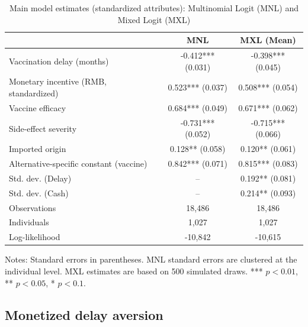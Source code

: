\documentclass[doublespacing]{utdthesis}
\begin{document}
\begin{table}[htbp]
\centering
\caption{Main model estimates (standardized attributes): Multinomial Logit (MNL) and Mixed Logit (MXL)}
\label{tab:main_models_std}
\begin{threeparttable}
\begin{tabular}{lcc}
\toprule
 & MNL & MXL (Mean) \\
\midrule
Vaccination delay (months) & -0.412*** (0.031) & -0.398*** (0.045) \\
Monetary incentive (RMB, standardized) & 0.523*** (0.037) & 0.508*** (0.054) \\
Vaccine efficacy & 0.684*** (0.049) & 0.671*** (0.062) \\
Side-effect severity & -0.731*** (0.052) & -0.715*** (0.066) \\
Imported origin & 0.128** (0.058) & 0.120** (0.061) \\
Alternative-specific constant (vaccine) & 0.842*** (0.071) & 0.815*** (0.083) \\
\midrule
Std. dev. (Delay) & -- & 0.192** (0.081) \\
Std. dev. (Cash) & -- & 0.214** (0.093) \\
\midrule
Observations & 18,486 & 18,486 \\
Individuals & 1,027 & 1,027 \\
Log-likelihood & -10,842 & -10,615 \\
\bottomrule
\end{tabular}
\begin{tablenotes}
\footnotesize
\item Notes: Standard errors in parentheses. MNL standard errors are clustered at the individual level. MXL estimates are based on 500 simulated draws. *** $p<0.01$, ** $p<0.05$, * $p<0.1$.
\end{tablenotes}
\end{threeparttable}
\end{table}
\clearpage

\subsection{Monetized delay aversion}
\label{subsec:essay2_monetized}
\end{document}

